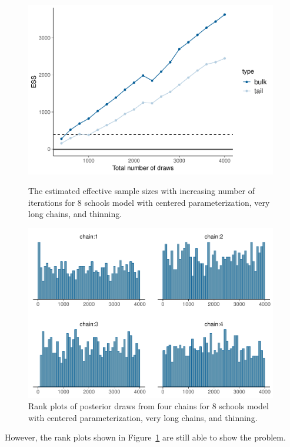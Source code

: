 \documentclass[american,]{article}
\theoremstyle{definition}
\begin{document}
\begin{figure}[tp]
  \centering
  \begin{minipage}{0.48\textwidth}
  \includegraphics[width=0.98\textwidth]{graphics/change-ess-fit-cp4-tau-1.pdf}
  \caption{The estimated effective sample sizes with increasing number of iterations for 8 schools model with centered parameterization, very long chains, and thinning.}
  \label{fig:change-ess-fit-cp4-tau-1}
\end{minipage}
\hfill
  \begin{minipage}{0.48\textwidth}
  \includegraphics[width=0.98\textwidth]{graphics/hist-fit-cp4-tau-1.pdf}
  \caption{Rank plots of posterior draws from four chains for 8
    schools model with centered parameterization, very long chains, and
    thinning.}
  \label{fig:hist-fit-cp4-tau-1}
\end{minipage}
\end{figure}
However, the rank plots shown in Figure~\ref{fig:hist-fit-cp4-tau-1}
are still able to show the problem.
\end{document}
